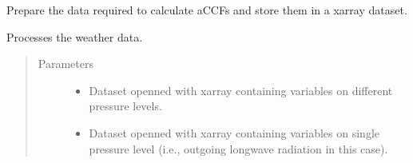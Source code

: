 \documentclass[a4paper,11pt,english]{sphinxmanual}
\begin{document}
\begin{fulllineitems}
\label{\detokenize{modules:envlib.weather_store.WeatherStore}}
Prepare the data required to calculate aCCFs and store them in a xarray dataset.

\begin{fulllineitems}
\label{\detokenize{modules:envlib.weather_store.WeatherStore.__init__}}
Processes the weather data.
\begin{quote}\begin{description}
\item[{Parameters}] \leavevmode\begin{itemize}
\item {} 
 \textendash{} Dataset openned with xarray containing variables on different pressure levels.

\item {} 
 \textendash{} Dataset openned with xarray containing variables on single pressure level (i.e., outgoing longwave radiation in this case).

\end{itemize}

\end{description}\end{quote}

\end{fulllineitems}



\end{fulllineitems}
\end{document}
